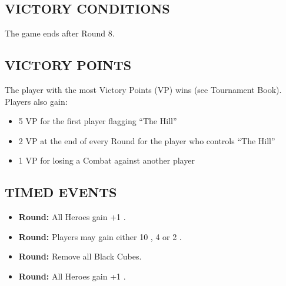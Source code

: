 \begin{multicols*}{2}
\subsection*{\MakeUppercase{Victory Conditions}}
The game ends after Round 8.

\subsection*{\MakeUppercase{Victory Points}}
The player with the most Victory Points (VP) wins (see Tournament Book). Players also gain:
\begin{itemize}
  \item 5 VP for the first player flagging ``The Hill''
  \item 2 VP at the end of every Round for the player who controls ``The Hill''
  \item 1 VP for losing a Combat against another player
\end{itemize}

\subsection*{\MakeUppercase{Timed Events}}

\begin{itemize}
  \item \textbf{ Round:} All Heroes gain +1 .
  \item \textbf{ Round:} Players may gain either 10 , 4  or 2 .
  \item \textbf{ Round:} Remove all Black Cubes.
  \item \textbf{ Round:} All Heroes gain +1 .
\end{itemize}


\end{multicols*}
